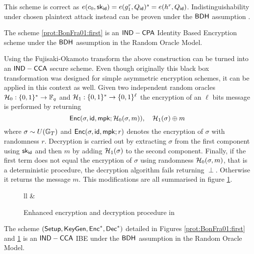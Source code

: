 This scheme is correct as $e(c_0, \sk_\cd{id}) = e(g_1^r, Q_\cd{id})^s = e(h^r, Q_\cd{id})$. Indistinguishability under chosen plaintext attack instead can be proven under the $\cd{BDH}$ assumption .
\begin{proposition}
	\label{prop:BonFra01:first}
	The scheme \ref{prot:BonFra01:first} is an $\cd{IND-CPA}$ Identity Based Encryption scheme under the $\cd{BDH}$ assumption in the Random Oracle Model.
\end{proposition}
Using the Fujisaki-Okamoto transform \cite{C:FujOka99} the above construction can be turned into an $\cd{IND-CCA}$ secure scheme. Even though originally this black box transformation was designed for simple asymmetric encryption schemes, it can be applied in this context as well. Given two independent random oracles $\ro[0] : \{0, 1\}^\ast \to \F_q$ and $\ro[1] : \{0, 1\}^\ast \to \{0, 1\}^\ell$ the encryption of an $\ell$ bits message is performed by returning
\[
	\cd{Enc}(\sigma, \cd{id}, \mpk; \ro[0](\sigma, m))
		, \quad
	\ro[1](\sigma) \oplus m
\]
where $\sigma \sim U(\G_T)$ and $\cd{Enc}(\sigma, \cd{id}, \mpk; r)$ denotes the encryption of $\sigma$ with randomness $r$.
Decryption is carried out by extracting $\sigma$ from the first component using $\sk_\cd{id}$ and then $m$ by adding $\ro[1](\sigma)$ to the second component.
Finally, if the first term does not equal the encryption of $\sigma$ using randomness $\ro[0](\sigma, m)$, that is a deterministic procedure, the decryption algorithm fails returning $\perp$. Otherwise it returns the message $m$.
This modifications are all summarised in figure \ref{prot:BonFra01:second}.

\begin{figure}[htb]
\centering
\begin{pcarray}{ll}
		&
\end{pcarray}
\caption{Enhanced encryption and decryption procedure in \cite{C:BonFra01}}
\label{prot:BonFra01:second}
\end{figure}

\begin{proposition}
	The scheme $(\cd{Setup}, \cd{KeyGen}, \cd{Enc}^\ast, \cd{Dec}^\ast)$ detailed in Figures \ref{prot:BonFra01:first} and \ref{prot:BonFra01:second} is an $\cd{IND-CCA}$ IBE under the $\cd{BDH}$ assumption in the Random Oracle Model.
\end{proposition}

